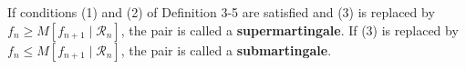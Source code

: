 If conditions (1) and (2) of Definition 3-5 are satisfied and (3) is replaced by $f_n \geq M[f_{n+1} \mid \mathcal{R}_n]$, the pair is called a \textbf{supermartingale}. If (3) is replaced by $f_n \leq M[f_{n+1} \mid \mathcal{R}_n]$, the pair is called a \textbf{submartingale}.